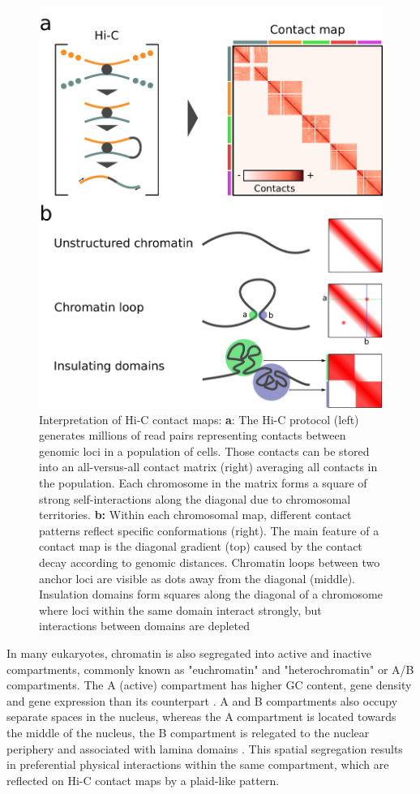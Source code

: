\begin{figure}[htb]
    \includegraphics[width=\textwidth]{Parts/Part01/gfx/hic_interpretation.pdf}
    \caption{Interpretation of Hi-C contact maps: \textbf{a}: The Hi-C protocol (left) generates millions of read pairs representing contacts between genomic loci in a population of cells. Those contacts can be stored into an all-versus-all contact matrix (right) averaging all contacts in the population. Each chromosome in the matrix forms a square of strong self-interactions along the diagonal due to chromosomal territories. \textbf{b:} Within each chromosomal map, different contact patterns reflect specific conformations (right). The main feature of a contact map is the diagonal gradient (top) caused by the contact decay according to genomic distances. Chromatin loops between two anchor loci are visible as dots away from the diagonal (middle). Insulation domains form squares along the diagonal of a chromosome where loci within the same domain interact strongly, but interactions between domains are depleted}
	\label{fig:01-02:hic}
\end{figure}

In many eukaryotes, chromatin is also segregated into active and inactive compartments, commonly known as "euchromatin" and "heterochromatin" or A/B compartments. The A (active) compartment has higher GC content, gene density and gene expression than its counterpart \cite{lieberman-aidenComprehensiveMappingLongRange2009}. A and B compartments also occupy separate spaces in the nucleus, whereas the A compartment is located towards the middle of the nucleus, the B compartment is relegated to the nuclear periphery and associated with lamina domains \cite{vansteenselLaminaAssociatedDomainsLinks2017}. This spatial segregation results in preferential physical interactions within the same compartment, which are reflected on Hi-C contact maps by a plaid-like pattern. 


